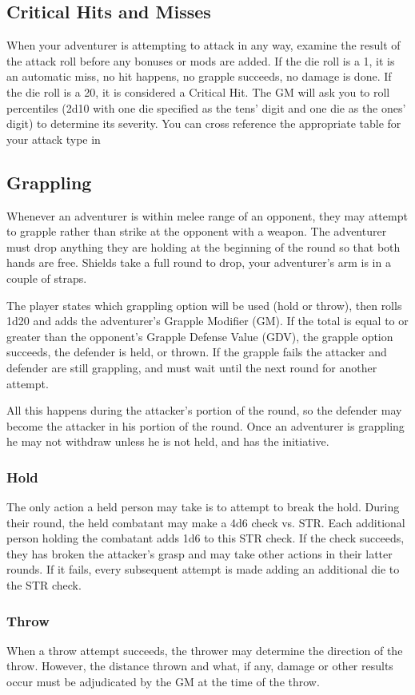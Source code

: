 \subsection{Critical Hits and Misses}
When your adventurer is attempting to attack in any way, examine the result of the attack roll before any bonuses or mods are added. If the die roll is a 1, it is an automatic miss, no hit happens, no grapple succeeds, no damage is
done. If the die roll is a 20, it is considered a Critical Hit. The GM will ask you to roll percentiles (2d10 with one die specified as the tens' digit and one die as the ones' digit) to determine its severity. You can cross reference the appropriate table for your attack type in 
\subsection{Grappling}
Whenever an adventurer is within melee range of an opponent, they may attempt to grapple rather than strike at the opponent with a weapon. The adventurer must drop anything they are holding at the beginning of the round so that both hands are free. Shields take a full round to drop, your adventurer's arm is in a couple of straps.

The player states which grappling option will be used (hold or throw), then rolls 1d20 and adds the adventurer's Grapple Modifier (GM). If the total is equal to or greater than the opponent's Grapple Defense Value (GDV), the grapple option succeeds, the defender is held, or thrown. If the grapple fails the attacker and defender are still grappling, and must wait until the next round for another attempt.

All this happens during the attacker's portion of the round, so the defender may become the attacker in his portion of the round. Once an adventurer is grappling he may not withdraw unless he is not held, and has the initiative.
\subsubsection{Hold}
The only action a held person may take is to attempt to break the hold. During their round, the held combatant may make a 4d6 check vs. STR. Each additional person holding the combatant adds 1d6 to this STR check. If the check succeeds, they has broken the attacker's grasp and may take other actions in their latter rounds. If it fails, every subsequent attempt is made adding an additional die to the STR check.
\subsubsection{Throw}
When a throw attempt succeeds, the thrower may determine the direction of the throw. However, the distance thrown and what, if any, damage or other results occur must be adjudicated by the GM at the time of the throw.

